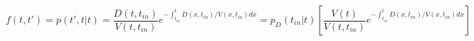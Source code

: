 \begin{equation}
f(t,t') = p(t',t|t)= \frac{D(t,t_{in})}{V(t,t_{in})}e^{-\int_{t_{in}}^t D(x,t_{in})/V(x,t_{in}) dx} = p_D(t_{in}|t)\left[ \frac{V(t)}{V(t,t_{in})} e^{-\int_{t_{in}}^t D(x,t_{in})/V(x,t_{in}) dx}\right]
\end{equation}